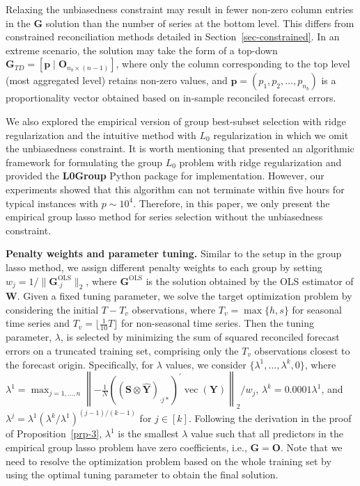 \documentclass[
  11pt]{article}
\theoremstyle{plain}
\theoremstyle{remark}
\begin{document}
Relaxing the unbiasedness constraint may result in fewer non-zero column
entries in the \(\bm{G}\) solution than the number of series at the
bottom level. This differs from constrained reconciliation methods
detailed in Section~\ref{sec-constrained}. In an extreme scenario, the
solution may take the form of a top-down
\(\bm{G}_{TD}=[\bm{p} \mid \bm{O}_{n_b \times (n-1)}]\), where only the
column corresponding to the top level (most aggregated level) retains
non-zero values, and \(\bm{p} = (p_1, p_2, \ldots, p_{n_b})\) is a
proportionality vector obtained based on in-sample reconciled forecast
errors.

We also explored the empirical version of group best-subset selection
with ridge regularization and the intuitive method with \(L_0\)
regularization in which we omit the unbiasedness constraint. It is worth
mentioning that \citet{Hazimeh2023-ie} presented an algorithmic
framework for formulating the group \(L_0\) problem with ridge
regularization and provided the \textbf{L0Group} Python package for
implementation. However, our experiments showed that this algorithm can
not terminate within five hours for typical instances with
\(p \sim 10^4\). Therefore, in this paper, we only present the empirical
group lasso method for series selection without the unbiasedness
constraint.

\textbf{Penalty weights and parameter tuning.} Similar to the setup in
the group lasso method, we assign different penalty weights to each
group by setting \(w_j = 1/\|\bm{G}_{\cdot j}^{\text{OLS}}\|_2\), where
\(\bm{G}^{\text{OLS}}\) is the solution obtained by the OLS estimator of
\(\bm{W}\). Given a fixed tuning parameter, we solve the target
optimization problem by considering the initial \(T-T_v\) observations,
where \(T_v = \max\{h, s\}\) for seasonal time series and
\(T_v = \lfloor \frac{1}{10}T \rfloor\) for non-seasonal time series.
Then the tuning parameter, \(\lambda\), is selected by minimizing the
sum of squared reconciled forecast errors on a truncated training set,
comprising only the \(T_v\) observations closest to the forecast origin.
Specifically, for \(\lambda\) values, we consider
\(\{\lambda^{1},\dots,\lambda^{k}, 0\}\), where
\(\lambda^{1} = \max_{j=1, \ldots, n}\left\|-\frac{1}{N}\left(\left(\bm{S} \otimes \hat{\bm{Y}}\right)_{\cdot j*}\right)^{\prime} \operatorname{vec}(\bm{Y})\right\|_2 / w_j\),
\(\lambda^{k} = 0.0001\lambda^{1}\), and
\(\lambda^{j} = \lambda^{1}\left(\lambda^{k} / \lambda^{1}\right)^{(j-1) / (k-1)}\)
for \(j \in [k]\). Following the derivation in the proof of
Proposition~\ref{prp-3}, \(\lambda^{1}\) is the smallest \(\lambda\)
value such that all predictors in the empirical group lasso problem have
zero coefficients, i.e., \(\bm{G} = \bm{O}\). Note that we need to
resolve the optimization problem based on the whole training set by
using the optimal tuning parameter to obtain the final solution.
\end{document}
